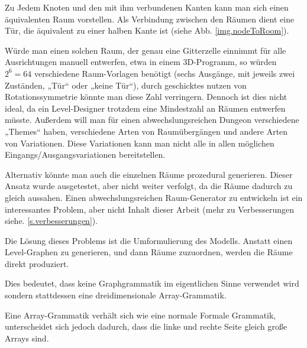 
Zu Jedem Knoten und den mit ihm verbundenen Kanten kann man sich einen äquivalenten Raum vorstellen. Als Verbindung zwischen den Räumen dient eine Tür, die äquivalent zu einer halben Kante ist (siehe Abb. \ref{img.nodeToRoom}).


Würde man einen solchen Raum, der genau eine Gitterzelle einnimmt für alle Ausrichtungen manuell entwerfen, etwa in einem 3D-Programm, so würden $ 2^6 = 64 $ verschiedene Raum-Vorlagen benötigt (sechs Ausgänge, mit jeweils zwei Zuständen, „Tür“ oder „keine Tür“), durch geschicktes nutzen von Rotationssymmetrie könnte man diese Zahl verringern. Dennoch ist dies nicht ideal, da ein Level-Designer trotzdem eine Mindestzahl an Räumen entwerfen müsste. Außerdem will man für einen abwechslungsreichen Dungeon verschiedene „Themes“ haben, verschiedene Arten von Raumübergängen und andere Arten von Variationen. Diese Variationen kann man nicht alle in allen möglichen Eingangs/Ausgangsvariationen bereitstellen. 


Alternativ könnte man auch die einzelnen Räume prozedural generieren. Dieser Ansatz wurde ausgetestet, aber nicht weiter verfolgt, da die Räume dadurch zu gleich aussahen.  Einen abwechslungsreichen Raum-Generator zu entwickeln ist ein interessantes Problem, aber nicht Inhalt dieser Arbeit (mehr zu Verbesserungen siehe. \ref{s.verbesserungen}).

Die Lösung dieses Problems ist die Umformulierung des Modells. Anstatt einen Level-Graphen zu generieren, und dann Räume zuzuordnen, werden die Räume direkt produziert. 

Dies bedeutet, dass keine Graphgrammatik im eigentlichen Sinne verwendet wird sondern stattdessen eine dreidimensionale Array-Grammatik. 

Eine Array-Grammatik verhält sich wie eine normale Formale Grammatik, unterscheidet sich jedoch dadurch, dass die linke und rechte Seite gleich große Arrays sind. 


